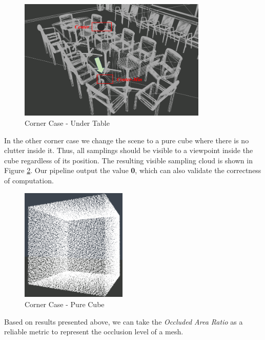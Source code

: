 \documentclass[11pt, a4paper,oneside,chapterprefix=false]{scrbook}
\begin{document}
\begin{figure}[H]
    \centering
    \includegraphics*[width=0.8\textwidth]{figures/edge case-under table.png}
    \caption{Corner Case - Under Table}
    \label{fig:corner case under table}
\end{figure}

In the other corner case we change the scene to a pure cube where there is no clutter inside it. Thus, all samplings should be visible to a viewpoint inside the cube regardless of its position. The resulting visible sampling cloud is shown in Figure \ref{fig:corner case pure cube}. Our pipeline output the value \textbf{0}, which can also validate the correctness of computation. 

\vspace{10pt}

\begin{figure}[H]
    \centering
    \includegraphics*[width=0.45\textwidth]{figures/cube with all samples.png}
    \caption{Corner Case - Pure Cube}
    \label{fig:corner case pure cube}
\end{figure}

Based on results presented above, we can take the \emph{Occluded Area Ratio} as a reliable metric to represent the occlusion level of a mesh.
\end{document}

